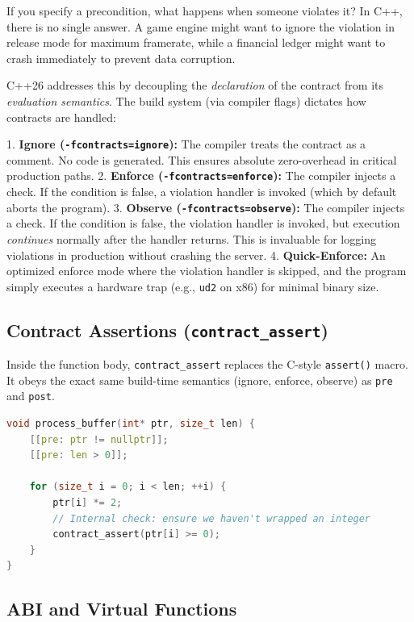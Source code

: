 If you specify a precondition, what happens when someone violates it? In C++, there is no single answer. A game engine might want to ignore the violation in release mode for maximum framerate, while a financial ledger might want to crash immediately to prevent data corruption.

C++26 addresses this by decoupling the \textit{declaration} of the contract from its \textit{evaluation semantics}. The build system (via compiler flags) dictates how contracts are handled:

1. \textbf{Ignore (\texttt{-fcontracts=ignore}):} The compiler treats the contract as a comment. No code is generated. This ensures absolute zero-overhead in critical production paths.
2. \textbf{Enforce (\texttt{-fcontracts=enforce}):} The compiler injects a check. If the condition is false, a violation handler is invoked (which by default aborts the program).
3. \textbf{Observe (\texttt{-fcontracts=observe}):} The compiler injects a check. If the condition is false, the violation handler is invoked, but execution \textit{continues} normally after the handler returns. This is invaluable for logging violations in production without crashing the server.
4. \textbf{Quick-Enforce:} An optimized enforce mode where the violation handler is skipped, and the program simply executes a hardware trap (e.g., \texttt{ud2} on x86) for minimal binary size.

\subsection{Contract Assertions (\texttt{contract_assert})}

Inside the function body, \texttt{contract_assert} replaces the C-style \texttt{assert()} macro. It obeys the exact same build-time semantics (ignore, enforce, observe) as \texttt{pre} and \texttt{post}.

\begin{lstlisting}[language=C++]
void process_buffer(int* ptr, size_t len) {
    [[pre: ptr != nullptr]];
    [[pre: len > 0]];
    
    for (size_t i = 0; i < len; ++i) {
        ptr[i] *= 2;
        // Internal check: ensure we haven't wrapped an integer
        contract_assert(ptr[i] >= 0); 
    }
}
\end{lstlisting}

\subsection{ABI and Virtual Functions}

